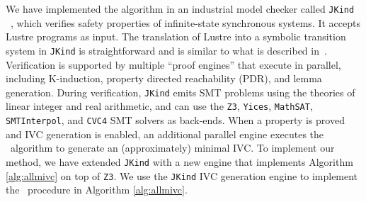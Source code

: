 We have implemented the %
algorithm
in an industrial model checker called \texttt{JKind} ~\cite{jkind},
which verifies safety properties of  infinite-state synchronous systems.
It accepts Lustre programs \cite{Halbwachs91:lustre} as input.  The translation of Lustre
into a symbolic transition system in \texttt{JKind} is straightforward and is similar to what is described
in~\cite{Hagen08:FMCAD}.
Verification is supported by multiple ``proof engines'' that execute in parallel, including K-induction,
property directed reachability (PDR), and lemma generation.  During verification,
\texttt{JKind} emits SMT problems using the theories of linear integer and real arithmetic, and can use the
\texttt{Z3}, \texttt{Yices}, \texttt{MathSAT}, \texttt{SMTInterpol}, and \texttt{CVC4} SMT solvers as back-ends.  When a property is
proved and IVC generation is enabled, an additional parallel engine
executes the \ucalg ~algorithm \cite{Ghass16} to generate an (approximately) minimal IVC.
%
To implement our method, we have extended \texttt{JKind} with a new engine that
implements Algorithm \ref{alg:allmivc} on top of \texttt{Z3}.
We use the \texttt{JKind} IVC generation engine to implement the \ucalg\ procedure in  Algorithm \ref{alg:allmivc}.


